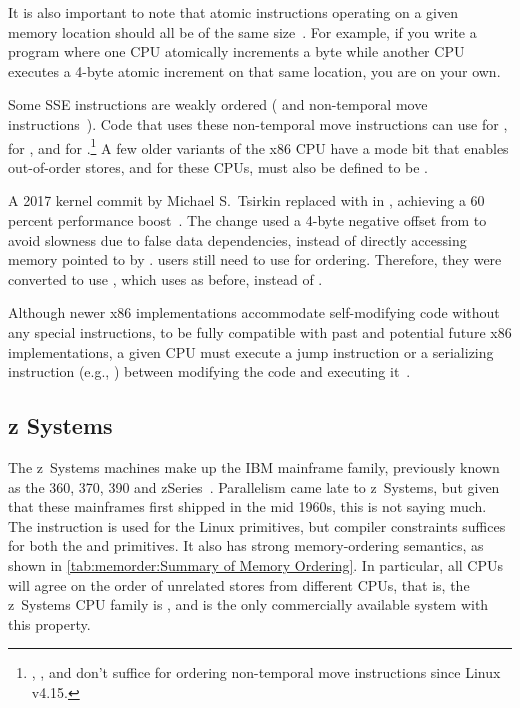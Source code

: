 It is also important to note that atomic instructions operating
on a given memory location should all be of the same
size~\cite[Section 8.1.2.2]{Intel64IA32v3A2016}.
For example, if you write a program where one CPU atomically increments
a byte while another CPU executes a 4-byte atomic increment on
that same location, you are on your own.

Some SSE instructions are weakly ordered (
and non-temporal move instructions~\cite{IntelXeonV2b-96a}).
Code that uses these non-temporal move instructions
can use  for ,
 for , and  for .\footnote{
	, , and  don't suffice
	for ordering non-temporal move instructions since Linux v4.15.}
A few older variants of the x86 CPU have a mode bit that enables out-of-order
stores, and for these CPUs,  must also be defined to
be .

A 2017 kernel commit by Michael S.~Tsirkin replaced  with
 in , achieving a 60 percent performance
boost~\cite{Tsirkin2017}.
The change used a 4-byte negative offset from  to avoid
slowness due to false data dependencies, instead of directly
accessing memory pointed to by .
 users still need to use  for ordering.
Therefore, they were converted to use , which uses 
as before, instead of .

Although newer x86 implementations accommodate self-modifying code
without any special instructions, to be fully compatible with
past and potential future x86 implementations, a given CPU must
execute a jump instruction or a serializing instruction (e.g., )
between modifying the code and executing
it~\cite[Section 8.1.3]{Intel64IA32v3A2011}.

\subsection{z Systems}

The z~Systems machines make up the IBM mainframe family, previously
known as the 360, 370, 390 and zSeries~\cite{IBMzSeries04a}.
Parallelism came late to z~Systems, but given that these mainframes first
shipped in the mid 1960s, this is not saying much.
The  instruction is used for the Linux  primitives,
but compiler constraints suffices for both the
 and  primitives.
It also has strong memory-ordering semantics, as shown in
\cref{tab:memorder:Summary of Memory Ordering}.
In particular, all CPUs will agree on the order of unrelated stores from
different CPUs, that is, the z~Systems CPU family is
,
and is the only commercially available system with this property.

